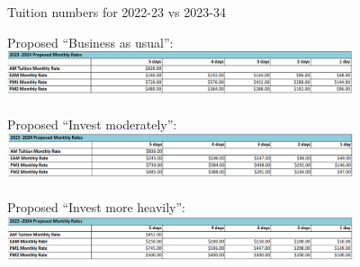 \documentclass[8pt]{beamer}
\begin{document}
\begin{frame}{Tuition numbers for 2022-23 vs 2023-34}

\begin{center}

Proposed ``Business as usual'':
\includegraphics[width=4in]{scenario_a_tuition.png}
\\\hrulefill\\

Proposed ``Invest moderately'':
\includegraphics[width=4in]{scenario_b_tuition.png}
\\\hrulefill\\

Proposed ``Invest more heavily'':
\includegraphics[width=4in]{scenario_c_tuition.png}
\\\hrulefill\\


\end{center}
\end{frame}
\end{document}
